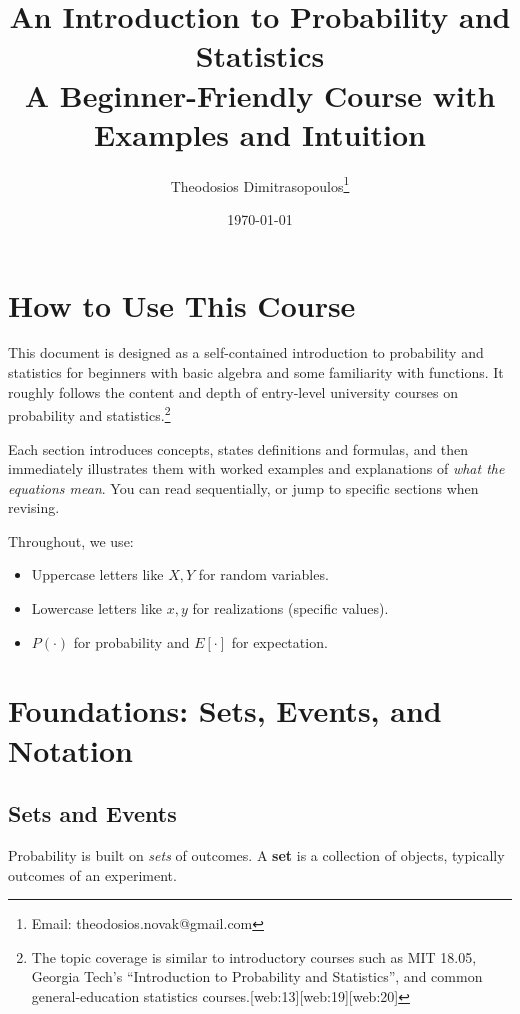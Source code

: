 \documentclass[11pt,a4paper]{article}
\title{An Introduction to Probability and Statistics\\[0.5em]
       \large A Beginner-Friendly Course with Examples and Intuition}
\author{Theodosios Dimitrasopoulos\footnote{Email: theodosios.novak@gmail.com}}
\date{\today}
\begin{document}
\maketitle
\tableofcontents
\newpage

\section{How to Use This Course}

This document is designed as a self-contained introduction to probability and statistics for beginners with basic algebra and some familiarity with functions. 
It roughly follows the content and depth of entry-level university courses on probability and statistics.\footnote{The topic coverage is similar to introductory courses such as MIT 18.05, Georgia Tech's ``Introduction to Probability and Statistics'', and common general-education statistics courses.[web:13][web:19][web:20]}

Each section introduces concepts, states definitions and formulas, and then immediately illustrates them with worked examples and explanations of \emph{what the equations mean}. 
You can read sequentially, or jump to specific sections when revising.

Throughout, we use:
\begin{itemize}
    \item Uppercase letters like \(X, Y\) for random variables.
    \item Lowercase letters like \(x, y\) for realizations (specific values).
    \item \(P(\cdot)\) for probability and \(E[\cdot]\) for expectation.
\end{itemize}

\newpage

\section{Foundations: Sets, Events, and Notation}

\subsection{Sets and Events}

Probability is built on \emph{sets} of outcomes. 
A \textbf{set} is a collection of objects, typically outcomes of an experiment.
\end{document}
